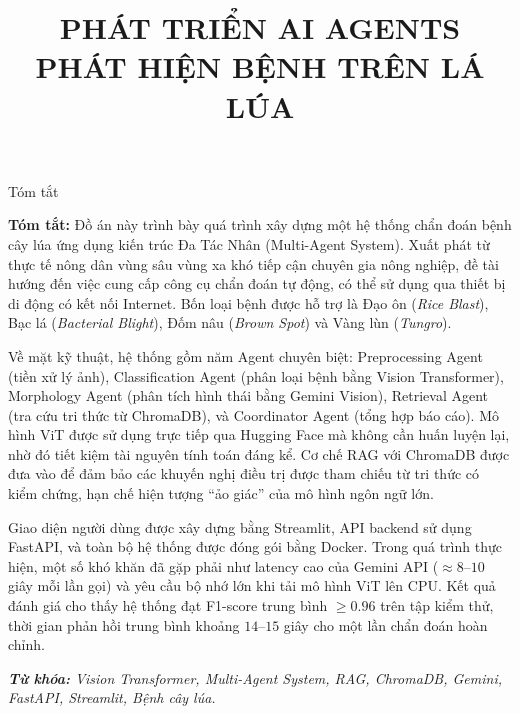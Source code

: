 \documentclass{uetgraduation}
\begin{document}

\title{PHÁT TRIỂN AI AGENTS \\ PHÁT HIỆN BỆNH TRÊN LÁ LÚA}

\makecovers

\begin{preamble}{Tóm tắt}
\textbf{Tóm tắt:} Đồ án này trình bày quá trình xây dựng một hệ thống chẩn đoán bệnh cây lúa ứng dụng kiến trúc Đa Tác Nhân (Multi-Agent System). Xuất phát từ thực tế nông dân vùng sâu vùng xa khó tiếp cận chuyên gia nông nghiệp, đề tài hướng đến việc cung cấp công cụ chẩn đoán tự động, có thể sử dụng qua thiết bị di động có kết nối Internet. Bốn loại bệnh được hỗ trợ là Đạo ôn (\textit{Rice Blast}), Bạc lá (\textit{Bacterial Blight}), Đốm nâu (\textit{Brown Spot}) và Vàng lùn (\textit{Tungro}).

Về mặt kỹ thuật, hệ thống gồm năm Agent chuyên biệt: Preprocessing Agent (tiền xử lý ảnh), Classification Agent (phân loại bệnh bằng Vision Transformer), Morphology Agent (phân tích hình thái bằng Gemini Vision), Retrieval Agent (tra cứu tri thức từ ChromaDB), và Coordinator Agent (tổng hợp báo cáo). Mô hình ViT được sử dụng trực tiếp qua Hugging Face mà không cần huấn luyện lại, nhờ đó tiết kiệm tài nguyên tính toán đáng kể. Cơ chế RAG với ChromaDB được đưa vào để đảm bảo các khuyến nghị điều trị được tham chiếu từ tri thức có kiểm chứng, hạn chế hiện tượng ``ảo giác'' của mô hình ngôn ngữ lớn.

Giao diện người dùng được xây dựng bằng Streamlit, API backend sử dụng FastAPI, và toàn bộ hệ thống được đóng gói bằng Docker. Trong quá trình thực hiện, một số khó khăn đã gặp phải như latency cao của Gemini API ($\approx 8$--$10$ giây mỗi lần gọi) và yêu cầu bộ nhớ lớn khi tải mô hình ViT lên CPU. Kết quả đánh giá cho thấy hệ thống đạt F1-score trung bình $\geq 0.96$ trên tập kiểm thử, thời gian phản hồi trung bình khoảng $14$--$15$ giây cho một lần chẩn đoán hoàn chỉnh.

\vspace{0.5cm}
\noindent \textit{\textbf{Từ khóa:} Vision Transformer, Multi-Agent System, RAG, ChromaDB, Gemini, FastAPI, Streamlit, Bệnh cây lúa.}
\end{preamble}
\clearpage
{}
\end{document}
